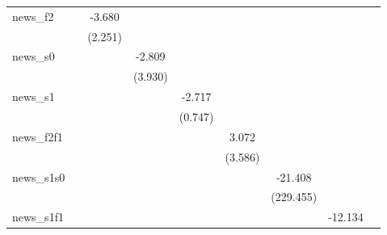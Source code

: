 {\begin{tabular}{l*{8}{c}}
\addlinespace
news\_f2     &                     &      -3.680         &                     &                     &                     &                     &                     &                     \\
            &                     &     (2.251)         &                     &                     &                     &                     &                     &                     \\
\addlinespace
news\_s0     &                     &                     &      -2.809         &                     &                     &                     &                     &                     \\
            &                     &                     &     (3.930)         &                     &                     &                     &                     &                     \\
\addlinespace
news\_s1     &                     &                     &                     &      -2.717\sym{***}&                     &                     &                     &                     \\
            &                     &                     &                     &     (0.747)         &                     &                     &                     &                     \\
\addlinespace
news\_f2f1   &                     &                     &                     &                     &       3.072         &                     &                     &                     \\
            &                     &                     &                     &                     &     (3.586)         &                     &                     &                     \\
\addlinespace
news\_s1s0   &                     &                     &                     &                     &                     &     -21.408         &                     &                     \\
            &                     &                     &                     &                     &                     &   (229.455)         &                     &                     \\
\addlinespace
news\_s1f1   &                     &                     &                     &                     &                     &                     &     -12.134         &                     \\

\end{tabular}}
